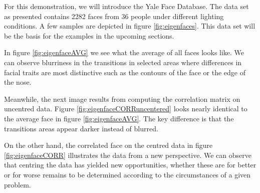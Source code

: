 \begin{minipage}[h][120mm][t]{0.55\linewidth}

    \setlength{\parindent}{2em}

    \bigskip

    \noindent
    For this demonstration, we will introduce the Yale Face Database.
    The data set as presented contains 2282 faces from 36 people under different lighting conditions.
    A few samples are depicted in figure \ref{fig:eigenfaces}.
    This data set will be the basis for the examples in the upcoming sections.

    \bigskip

    In figure \ref{fig:eigenfaceAVG} we see what the average of all faces looks like.
    We can observe blurriness in the transitions in selected areas where differences in facial traits are most distinctive such as the contours of the face or the edge of the nose.

    \medskip

    Meanwhile, the next image results from computing the correlation matrix on uncentred data.
    Figure \ref{fig:eigenfaceCORRuncentered} looks nearly identical to the average face in figure \ref{fig:eigenfaceAVG}.
    The key difference is that the transitions areas appear darker instead of blurred.

    \medskip

    On the other hand, the correlated face on the centred data in figure \ref{fig:eigenfaceCORR} illustrates the data from a new perspective.
    We can observe that centring the data has yielded new opportunities, whether these are for better or for worse remains to be determined according to the circumstances of a given problem.


\end{minipage}%
